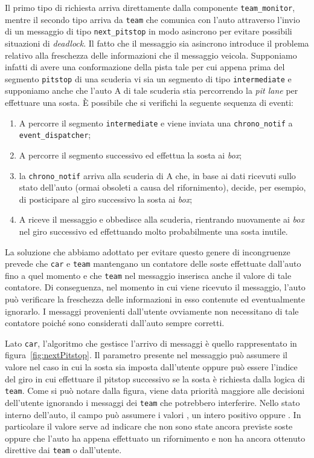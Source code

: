 Il primo tipo di richiesta arriva direttamente dalla componente \texttt{team\_monitor}, mentre il secondo tipo arriva da \texttt{team} che comunica con l'auto attraverso l'invio di un messaggio di tipo \texttt{next\_pitstop} in modo asincrono per evitare possibili situazioni di \textit{deadlock}. Il fatto che il messaggio sia asincrono introduce il problema relativo alla freschezza delle informazioni che il messaggio veicola. Supponiamo infatti di avere una conformazione della pista tale per cui appena prima del segmento \texttt{pitstop} di una scuderia vi sia un segmento di tipo \texttt{intermediate} e supponiamo anche che l'auto A di tale scuderia stia percorrendo la \textit{pit lane} per effettuare una sosta.
\`E possibile che si verifichi la seguente sequenza di eventi:
\begin{enumerate}
\item A percorre il segmento \texttt{intermediate} e viene inviata una \texttt{chrono\_notif} a \texttt{event\_dispatcher};
\item A percorre il segmento successivo ed effettua la sosta ai \textit{box};
\item la \texttt{chrono\_notif} arriva alla scuderia di A che, in base ai dati ricevuti sullo stato dell'auto (ormai obsoleti a causa del rifornimento), decide, per esempio, di posticipare al giro successivo la sosta ai \textit{box};
\item A riceve il messaggio e obbedisce alla scuderia, rientrando nuovamente ai \textit{box} nel giro successivo ed effettuando molto probabilmente una sosta inutile.
\end{enumerate}

La soluzione che abbiamo adottato per evitare questo genere di incongruenze prevede che \texttt{car} e \texttt{team} mantengano un contatore delle soste effettuate dall'auto fino a quel momento e che \texttt{team} nel messaggio  inserisca anche il valore di tale contatore. Di conseguenza, nel momento in cui viene ricevuto il messaggio, l'auto può verificare la freschezza delle informazioni in esso contenute ed eventualmente ignorarlo. I messaggi provenienti dall'utente ovviamente non necessitano di tale contatore poiché sono considerati dall'auto sempre corretti.

Lato \texttt{car}, l'algoritmo che gestisce l'arrivo di messaggi  è quello rappresentato in figura~\ref{fig:nextPitstop}. Il parametro  presente nel messaggio  può assumere il valore  nel caso in cui la sosta sia imposta dall'utente oppure può essere l'indice del giro in cui effettuare il pitstop successivo se la sosta è richiesta dalla logica di \texttt{team}. Come si può notare dalla figura, viene data priorità maggiore alle decisioni dell'utente ignorando i messaggi dei \texttt{team} che potrebbero interferire. Nello stato interno dell'auto, il campo  può assumere i valori , un intero positivo oppure . In particolare il valore  serve ad indicare che non sono state ancora previste soste oppure che l'auto ha appena effettuato un rifornimento e non ha ancora ottenuto direttive dai \texttt{team} o dall'utente.

